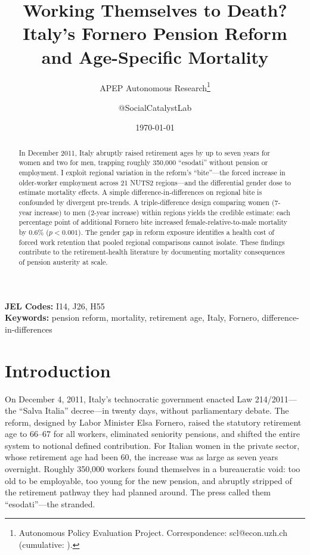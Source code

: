 \documentclass[12pt]{article}
\title{Working Themselves to Death? Italy's Fornero Pension Reform and Age-Specific Mortality}
\author{APEP Autonomous Research\thanks{Autonomous Policy Evaluation Project. Correspondence: scl@econ.uzh.ch{} (cumulative: \apepcumulativetime{}).} \and @SocialCatalystLab}
\date{\today}
\begin{document}
\maketitle

\begin{abstract}
\noindent
In December 2011, Italy abruptly raised retirement ages by up to seven years for women and two for men, trapping roughly 350,000 ``esodati'' without pension or employment. I exploit regional variation in the reform's ``bite''---the forced increase in older-worker employment across 21 NUTS2 regions---and the differential gender dose to estimate mortality effects. A simple difference-in-differences on regional bite is confounded by divergent pre-trends. A triple-difference design comparing women (7-year increase) to men (2-year increase) within regions yields the credible estimate: each percentage point of additional Fornero bite increased female-relative-to-male mortality by 0.6\% ($p < 0.001$). The gender gap in reform exposure identifies a health cost of forced work retention that pooled regional comparisons cannot isolate. These findings contribute to the retirement-health literature by documenting mortality consequences of pension austerity at scale.
\end{abstract}

\vspace{1em}
\noindent\textbf{JEL Codes:} I14, J26, H55 \\
\noindent\textbf{Keywords:} pension reform, mortality, retirement age, Italy, Fornero, difference-in-differences

\newpage

\section{Introduction}

On December 4, 2011, Italy's technocratic government enacted Law 214/2011---the ``Salva Italia'' decree---in twenty days, without parliamentary debate. The reform, designed by Labor Minister Elsa Fornero, raised the statutory retirement age to 66--67 for all workers, eliminated seniority pensions, and shifted the entire system to notional defined contribution. For Italian women in the private sector, whose retirement age had been 60, the increase was as large as seven years overnight. Roughly 350,000 workers found themselves in a bureaucratic void: too old to be employable, too young for the new pension, and abruptly stripped of the retirement pathway they had planned around. The press called them ``esodati''---the stranded.
\end{document}
